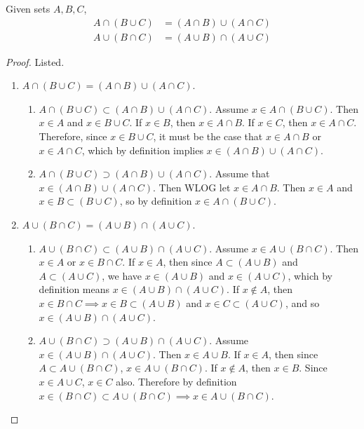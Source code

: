   \begin{theorem}[Distributivity] 
		\label{thm:distributive}
    Given sets $A, B, C$, 
    \begin{align}
      A \cap (B \cup C) & = (A \cap B) \cup (A \cap C) \\
      A \cup (B \cap C) & = (A \cup B) \cap (A \cup C)
    \end{align}
  \end{theorem}
  \begin{proof}
    Listed. 
    \begin{enumerate}
      \item $A \cap (B \cup C) = (A \cap B) \cup (A \cap C)$. 
        \begin{enumerate}
          \item $A \cap (B \cup C) \subset (A \cap B) \cup (A \cap C)$. Assume $x \in A \cap (B \cup C)$. Then $x \in A$ and $x \in B \cup C$. If $x \in B$, then $x \in A \cap B$. If $x \in C$, then $x \in A \cap C$. Therefore, since $x \in B \cup C$, it must be the case that $x \in A \cap B$ or $x \in A \cap C$, which by definition implies $x \in (A \cap B) \cup (A \cap C)$. 

          \item $A \cap (B \cup C) \supset (A \cap B) \cup (A \cap C)$. Assume that $x \in (A \cap B) \cup (A \cap C)$. Then WLOG let $x \in A \cap B$. Then $x \in A$ and $x \in B \subset (B \cup C)$, so by definition $x \in A \cap (B \cup C)$. 
        \end{enumerate}

      \item $A \cup (B \cap C) = (A \cup B) \cap (A \cup C)$.
        \begin{enumerate}
          \item $A \cup (B \cap C) \subset (A \cup B) \cap (A \cup C)$. Assume $x \in A \cup(B \cap C)$. Then $x \in A$ or $x \in B \cap C$. If $x \in A$, then since $A \subset (A \cup B)$ and $A \subset (A \cup C)$, we have $x \in (A \cup B)$ and $x \in (A \cup C)$, which by definition means $x \in (A \cup B) \cap (A \cup C)$. If $x \not\in A$, then $x \in B \cap C \implies x \in B \subset (A \cup B)$ and $x \in C \subset (A \cup C)$, and so $x \in (A \cup B) \cap (A \cup C)$. 

          \item $A \cup (B \cap C) \supset (A \cup B) \cap (A \cup C)$. Assume $x \in (A \cup B) \cap (A \cup C)$. Then $x \in A \cup B$. If $x \in A$, then since $A \subset A \cup (B \cap C)$, $x \in A \cup (B \cap C)$. If $x \not\in A$, then $x \in B$. Since $x \in A \cup C$, $x \in C$ also. Therefore by definition $x \in (B \cap C) \subset A \cup (B \cap C) \implies x \in A \cup (B \cap C)$. 
        \end{enumerate}
    \end{enumerate}
  \end{proof}

